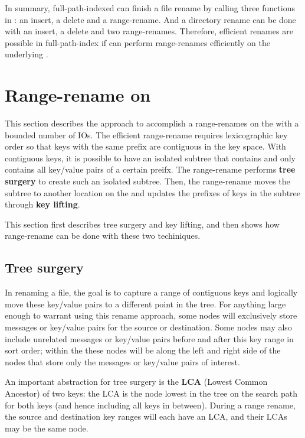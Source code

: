 In summary, full-path-indexed \betrfs can finish a file rename by calling three
functions in \fti: an insert, a delete and a range-rename.
And a directory rename can be done with an insert, a delete and two
range-renames.
Therefore, efficient renames are possible in full-path-index \betrfs if
\fti can perform range-renames efficiently on the underlying \bets.

\section{Range-rename on \bets}

This section describes the approach to accomplish a range-renames on the \bet
with a bounded number of IOs.
The efficient range-rename requires lexicographic key order so that keys with
the same prefix are contiguous in the key space.
With contiguous keys, it is possible to have an isolated subtree that contains
and only contains all key/value pairs of a certain preifx.
The range-rename performs \textbf{tree surgery} to create such an isolated
subtree.
Then, the range-rename moves the subtree to another location on the \bet and
updates the prefixes of keys in the subtree through \textbf{key lifting}.

This section first describes tree surgery and key lifting, and then shows how
range-rename can be done with these two techiniques.

\subsection{Tree surgery}

In renaming a file, the goal is to capture a range of contiguous keys and
logically move these key/value pairs to a different point in the tree.
For anything large enough to warrant using this rename approach,
some \bet nodes will exclusively store messages or key/value pairs
for the source or destination.
Some nodes may also include unrelated messages or key/value pairs
before and after this key range in sort order;
within the \bet these nodes will be along the left and right side of the nodes
that store only the messages or key/value pairs of interest.

An important abstraction for tree surgery is the \textbf{LCA}
(Lowest Common Ancestor) of two keys: the LCA is the \bet node lowest in the
tree on the search path for both keys (and hence including all keys in between).
During a range rename, the source and destination key ranges will each have an
LCA, and their LCAs may be the same node.

